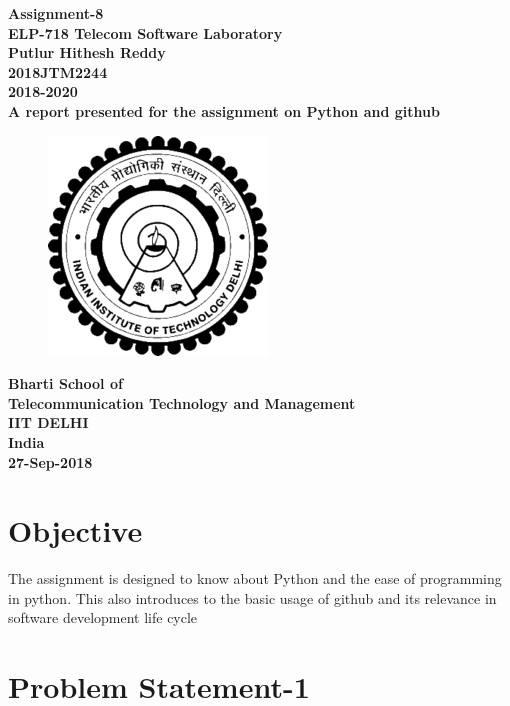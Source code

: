 \documentclass[10pt]{article}
\begin{document}
	
\begin{center}
	\textbf{\Large Assignment-8}\\
	\vspace{1mm}
	\textbf{\Large ELP-718 Telecom Software Laboratory}\\
	\textbf{Putlur Hithesh Reddy} \\
	\textbf{2018JTM2244} \\
	\textbf{2018-2020 }\\ 
	\textbf{A report presented for the assignment on \textbf{Python and github}} \\ [1.5 in]	
\end{center}

\begin{figure}[h!]
	\centering
	\includegraphics{iitlogo} \\  [1.5 in]	
\end{figure}

\begin{center}
	\textbf{Bharti School of}\\ 
\textbf{Telecommunication Technology and Management }\\
\textbf{IIT DELHI}\\
\textbf{India}\\
\textbf{27-Sep-2018}
\end{center}

\newpage
\tableofcontents
\newpage

\section{\textbf{\Large Objective}}
 The assignment is designed to know about Python and the ease of programming in python. This also introduces to the basic usage of github and its relevance in software development life cycle
 
 
 
 
\section{\textbf{\large Problem Statement-1}}
\end{document}
